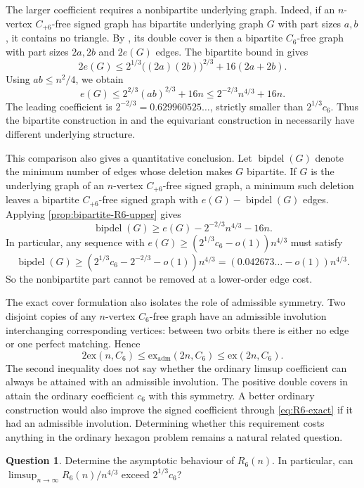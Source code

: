 \documentclass{article}
\newcommand{\ex}{\mathrm{ex}}
\newcommand{\exadm}{\ex_{\mathrm{adm}}}
\theoremstyle{definition}
\newtheorem{question}[theorem]{Question}
\theoremstyle{remark}
\begin{document}
The larger coefficient requires a nonbipartite underlying graph.  Indeed,
if an $n$-vertex $C_{+6}$-free signed graph has bipartite underlying graph
$G$ with part sizes $a,b$, it contains no triangle.  By ,
its double cover is then a bipartite $C_6$-free graph with part sizes
$2a,2b$ and $2e(G)$ edges.  The bipartite bound in
\cite{MR2227729} gives
\[
2e(G)\leq2^{1/3}\bigl((2a)(2b)\bigr)^{2/3}+16(2a+2b).
\]
Using $ab\leq n^2/4$, we obtain
\begin{equation}\label{prop:bipartite-R6-upper}
e(G)\leq2^{2/3}(ab)^{2/3}+16n\leq2^{-2/3}n^{4/3}+16n.
\end{equation}
The leading coefficient is $2^{-2/3}=0.629960525\ldots$, strictly
smaller than $2^{1/3}c_6$.  Thus the bipartite construction in
 and the equivariant construction in
 necessarily have different underlying structure.

This comparison also gives a quantitative conclusion.  Let
$\operatorname{bipdel}(G)$ denote the minimum number of edges whose
deletion makes $G$ bipartite.  If $G$ is the underlying graph of an
$n$-vertex $C_{+6}$-free signed graph, a minimum such deletion leaves a bipartite
$C_{+6}$-free signed graph with $e(G)-\operatorname{bipdel}(G)$ edges.
Applying \eqref{prop:bipartite-R6-upper} gives
\[
\operatorname{bipdel}(G)\geq e(G)-2^{-2/3}n^{4/3}-16n.
\]
In particular, any sequence with
$e(G)\geq(2^{1/3}c_6-o(1))n^{4/3}$ must satisfy
\[
\operatorname{bipdel}(G)\geq
\left(2^{1/3}c_6-2^{-2/3}-o(1)\right)n^{4/3}
=(0.042673\ldots-o(1))n^{4/3}.
\]
So the nonbipartite part cannot be removed at a lower-order edge cost.

The exact cover formulation also isolates the role of admissible symmetry.
Two disjoint copies of any $n$-vertex $C_6$-free graph have an admissible
involution interchanging corresponding vertices: between two orbits there
is either no edge or one perfect matching.  Hence
\[
2\ex(n,C_6)\leq\exadm(2n,C_6)\leq\ex(2n,C_6).
\]
The second inequality does not say whether the ordinary limsup
coefficient can always be attained with an admissible involution.
The positive double covers in  attain the ordinary
coefficient $c_6$ with this symmetry.  A better ordinary construction would also improve the signed
coefficient through \eqref{eq:R6-exact} if it had an admissible
involution.  Determining whether this requirement costs anything in the
ordinary hexagon problem remains a natural related question.

\begin{question}\label{ques:R6}
Determine the asymptotic behaviour of $R_6(n)$.  In particular, can
$\limsup_{n\to\infty}R_6(n)/n^{4/3}$ exceed $2^{1/3}c_6$?
\end{question}
\end{document}
